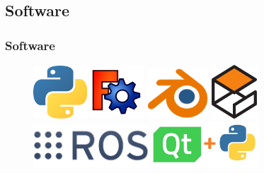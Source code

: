 \documentclass{beamer}
\begin{document}
\subsection{Software}
\begin{frame}
	\frametitle{Software}
	\begin{figure}
		\centering
		\includegraphics[width=2cm]{figs/pythonlogo}\hspace{0.5cm}
		\includegraphics[width=2cm]{figs/freecadlogo}\hspace{0.3cm}
		\includegraphics[width=2.3cm]{figs/blenderlogo}\hspace{0.5cm}
		\includegraphics[width=1.7cm]{figs/gazebologo}\\
		\vspace{1cm}\includegraphics[width=4.3cm]{figs/roslogo}\hspace{0.5cm}
		\includegraphics[width=4cm]{figs/pyqtlogo}
	\end{figure}
\end{frame}
\end{document}
